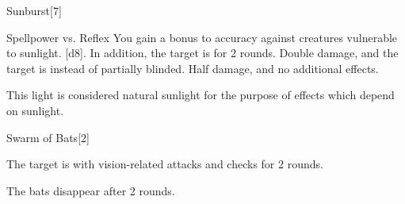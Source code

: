 \begin{spellsection}{Sunburst}[7]
    \begin{spellheader}
    \end{spellheader}
    \begin{spellcontent}
        \begin{spelltargetinginfo}
        \end{spelltargetinginfo}
        \begin{spelleffects}
            \begin{spellattack}{Spellpower vs. Reflex}
                \spellspecial You gain a  bonus to accuracy against creatures vulnerable to sunlight.
                \spellsuccess {}[d8]. In addition, the target is \partiallyblinded for 2 rounds.
                \spellcritical Double damage, and the target is \blinded instead of partially blinded.
                \spellfailure Half damage, and no additional effects.
            \end{spellattack}
        \end{spelleffects}
    \end{spellcontent}
    \begin{spellfooter}
        \spellnotes This light is considered natural sunlight for the purpose of effects which depend on sunlight.
        \miscastyou
    \end{spellfooter}
\end{spellsection}

\begin{spellsection}{Swarm of Bats}[2]
    \begin{spellheader}
    \end{spellheader}
    \begin{spellcontent}
        \begin{spelltargetinginfo}
        \end{spelltargetinginfo}
        \begin{spelleffects}
            \spelleffect The target is \impaired with vision-related attacks and checks for 2 rounds.
        \end{spelleffects}
    \end{spellcontent}
    \begin{spellfooter}
        \spellnotes The bats disappear after 2 rounds.
        \miscastyou
    \end{spellfooter}
    \begin{spellaugments}
    \end{spellaugments}
\end{spellsection}

